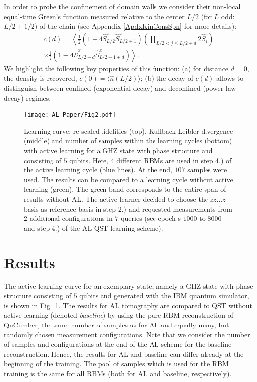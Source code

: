 \documentclass[pra,aps,showpacs,groupedaddress,superscriptaddress,twocolumn,toc=flat,biblatex,footinbib]{revtex4-1}
\renewcommand{\l}{\left(}
\renewcommand{\r}{\right)}
\begin{document}
In order to probe the confinement of domain walls we consider their non-local equal-time Green's function measured relative to the center $L/2$ (for $L$ odd: $L/2+1/2$) of the chain (see Appendix \ref{ApdxKinConsSpn} for more details):
\begin{multline}
    c(d) = \left \langle
    \frac{1}{2} \l 1 - 4\hat{S}^{x}_{L/2}\hat{S}^{x}_{L/2+1} \r \l \prod_{L/2 < j \leq L/2+d}
    2 \hat{S}^{z}_{j} \r  \right. \\
   \times \left. \frac{1}{2} \l 1- 4\hat{S}^{x}_{L/2+d}\hat{S}^{x}_{L/2+1+d} \r
    \right \rangle .
    \label{eq:GreensSpinDef}
\end{multline}
We highlight the following key properties of this function: (a) for distance $d=0$, the density is recovered, $c(0) = \langle \hat{n}(L/2) \rangle$; (b) the decay of $c(d)$ allows to distinguish between confined (exponential decay) and deconfined (power-law decay) regimes.




\begin{figure}[t]
	\centering
  \texttt{[image: AL\_Paper/Fig2.pdf]}
	\caption[Learning curve with active learning]{Learning curve: re-scaled fidelities (top), Kullback-Leibler divergence (middle) and number of samples within the learning cycles (bottom) with active learning for a GHZ state with phase structure and consisting of $5$ qubits. Here, $4$ different RBMs are used in step 4.) of the active learning cycle (blue lines). At the end, $107$ samples were used. The results can be compared to a learning cycle without active learning (green). The green band corresponds to the entire span of results without AL. The active learner decided to choose the $zz\dots z$ basis as reference basis in step 2.) and requested measurements from $2$ additional configurations in $7$ queries (see epoch s $1000$ to $8000$ and step 4.) of the AL-QST learning scheme).}
	\label{fig:ALLearningCurve}
\end{figure}


\section{Results\label{sec:Results}}
The active learning curve for an exemplary state, namely a GHZ state with phase structure consisting of $5$ qubits and generated with the IBM quantum simulator, is shown in Fig.~\ref{fig:ALLearningCurve}. The results for AL tomography are compared to QST without active learning (denoted \textit{baseline}) by using the pure RBM reconstruction of QuCumber, the same number of samples as for AL and equally many, but randomly chosen measurement configurations. Note that we consider the number of samples and configurations at the end of the AL scheme for the baseline reconstruction. Hence, the results for AL and baseline can differ already at the beginning of the training. The pool of samples which is used for the RBM training is the same for all RBMs (both for AL and baseline, respectively).\\
\end{document}
